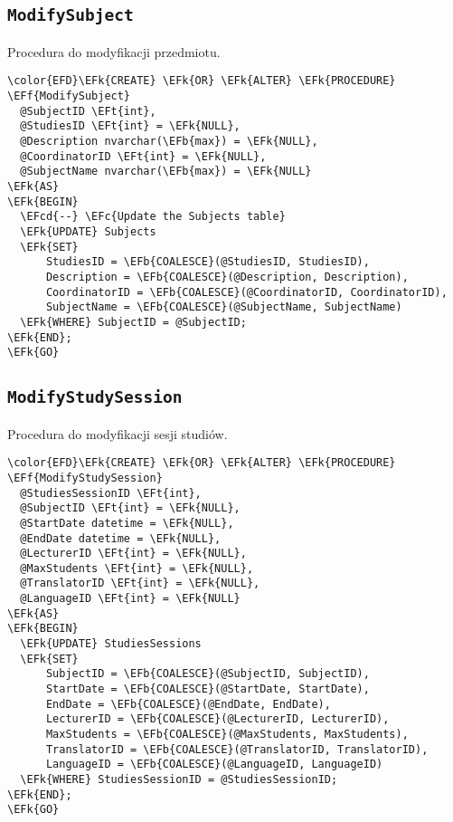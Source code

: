 \documentclass[11pt]{article}
\newcommand{\EFc}[1]{\textcolor{EFc}{\textit{#1}}} %
\newcommand{\EFcd}[1]{\textcolor{EFcd}{\textit{#1}}} %
\newcommand{\EFk}[1]{\textcolor{EFk}{\textbf{#1}}} %
\newcommand{\EFb}[1]{\textcolor{EFb}{\textbf{#1}}} %
\newcommand{\EFf}[1]{\textcolor{EFf}{#1}} %
\newcommand{\EFt}[1]{\textcolor{EFt}{\textbf{#1}}} %
\begin{document}
\subsection{\texttt{ModifySubject}}
\label{sec:org922bd80}
Procedura do modyfikacji przedmiotu.
\begin{Code}
\begin{Verbatim}
\color{EFD}\EFk{CREATE} \EFk{OR} \EFk{ALTER} \EFk{PROCEDURE} \EFf{ModifySubject}
  @SubjectID \EFt{int},
  @StudiesID \EFt{int} = \EFk{NULL},
  @Description nvarchar(\EFb{max}) = \EFk{NULL},
  @CoordinatorID \EFt{int} = \EFk{NULL},
  @SubjectName nvarchar(\EFb{max}) = \EFk{NULL}
\EFk{AS}
\EFk{BEGIN}
  \EFcd{--} \EFc{Update the Subjects table}
  \EFk{UPDATE} Subjects
  \EFk{SET} 
      StudiesID = \EFb{COALESCE}(@StudiesID, StudiesID),
      Description = \EFb{COALESCE}(@Description, Description),
      CoordinatorID = \EFb{COALESCE}(@CoordinatorID, CoordinatorID),
      SubjectName = \EFb{COALESCE}(@SubjectName, SubjectName)
  \EFk{WHERE} SubjectID = @SubjectID;
\EFk{END};
\EFk{GO}
\end{Verbatim}
\end{Code}
\subsection{\texttt{ModifyStudySession}}
\label{sec:org92a835f}
Procedura do modyfikacji sesji studiów.
\begin{Code}
\begin{Verbatim}
\color{EFD}\EFk{CREATE} \EFk{OR} \EFk{ALTER} \EFk{PROCEDURE} \EFf{ModifyStudySession}
  @StudiesSessionID \EFt{int},
  @SubjectID \EFt{int} = \EFk{NULL},
  @StartDate datetime = \EFk{NULL},
  @EndDate datetime = \EFk{NULL},
  @LecturerID \EFt{int} = \EFk{NULL},
  @MaxStudents \EFt{int} = \EFk{NULL},
  @TranslatorID \EFt{int} = \EFk{NULL},
  @LanguageID \EFt{int} = \EFk{NULL}
\EFk{AS}
\EFk{BEGIN}
  \EFk{UPDATE} StudiesSessions
  \EFk{SET} 
      SubjectID = \EFb{COALESCE}(@SubjectID, SubjectID),
      StartDate = \EFb{COALESCE}(@StartDate, StartDate),
      EndDate = \EFb{COALESCE}(@EndDate, EndDate),
      LecturerID = \EFb{COALESCE}(@LecturerID, LecturerID),
      MaxStudents = \EFb{COALESCE}(@MaxStudents, MaxStudents),
      TranslatorID = \EFb{COALESCE}(@TranslatorID, TranslatorID),
      LanguageID = \EFb{COALESCE}(@LanguageID, LanguageID)
  \EFk{WHERE} StudiesSessionID = @StudiesSessionID;
\EFk{END};
\EFk{GO}
\end{Verbatim}
\end{Code}
\end{document}
